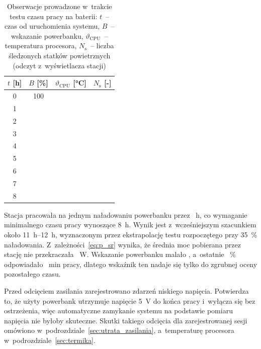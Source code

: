 \begin{table}[!htb]
  \centering
  \caption{Obserwacje prowadzone w~trakcie testu czasu pracy na baterii: $t$~-- czas od uruchomienia systemu, $B$~-- wskazanie powerbanku, $\vartheta_{\mathrm{CPU}}$~-- temperatura procesora, $N_{\mathrm{s}}$~-- liczba śledzonych statków powietrznych (odczyt z~wyświetlacza stacji)}
  \label{tab:bateria_obserwacje}
  \begin{tabular}{cccc}
    \toprule
    $t$ [h] & $B$ [\%] & $\vartheta_{\mathrm{CPU}}$ [\si{\degreeCelsius}] & $N_{\mathrm{s}}$ [-] \\
    \midrule
    0 & 100 & \uzup{} & \uzup{} \\
    1 & \uzup{} & \uzup{} & \uzup{} \\
    2 & \uzup{} & \uzup{} & \uzup{} \\
    3 & \uzup{} & \uzup{} & \uzup{} \\
    4 & \uzup{} & \uzup{} & \uzup{} \\
    5 & \uzup{} & \uzup{} & \uzup{} \\
    6 & \uzup{} & \uzup{} & \uzup{} \\
    7 & \uzup{} & \uzup{} & \uzup{} \\
    8 & \uzup{} & \uzup{} & \uzup{} \\
    \bottomrule
  \end{tabular}
\end{table}

Stacja pracowała na jednym naładowaniu powerbanku przez ~\si{h}, co  wymaganie minimalnego czasu pracy wynoszące \SI{8}{h}. Wynik jest  z~wcześniejszym szacunkiem około \SIrange{11}{12}{h}, wyznaczonym przez ekstrapolację testu rozpoczętego przy \SI{35}{\percent} naładowania. Z~zależności~\eqref{eq:p_sr} wynika, że średnia moc pobierana przez stację nie przekraczała ~\si{W}. Wskazanie powerbanku malało , a~ostatnie ~\si{\percent} odpowiadało ~\si{min} pracy, dlatego wskaźnik ten nadaje się tylko do zgrubnej oceny pozostałego czasu.

Przed odcięciem zasilania zarejestrowano  zdarzeń niskiego napięcia. Potwierdza to, że użyty powerbank utrzymuje napięcie \SI{5}{V} do końca pracy i~wyłącza się bez ostrzeżenia, więc automatyczne zamykanie systemu na podstawie pomiaru napięcia nie byłoby skuteczne. Skutki takiego odcięcia dla zarejestrowanej sesji omówiono w~podrozdziale~\ref{sec:utrata_zasilania}, a~temperaturę procesora w~podrozdziale~\ref{sec:termika}.

